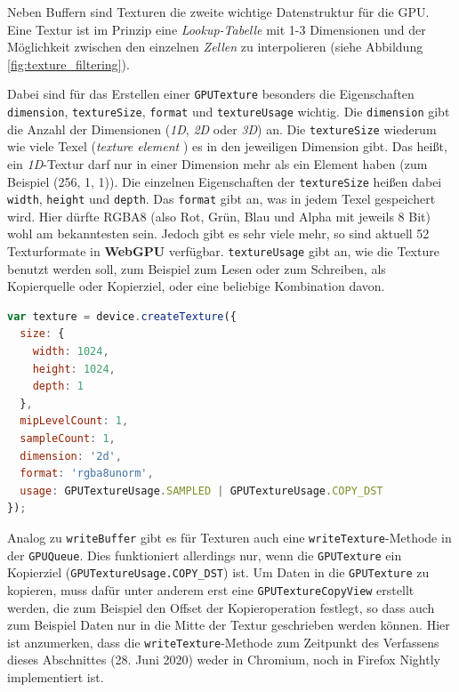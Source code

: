 \documentclass[oneside]{ausarbeitung}
\begin{document}
Neben Buffern sind Texturen die zweite wichtige Datenstruktur für die \ac{GPU}. Eine Textur ist im Prinzip eine \textit{Lookup-Tabelle} \cite{wikipedia:lookup} mit 1-3 Dimensionen und der Möglichkeit zwischen den einzelnen \textit{Zellen} zu interpolieren (siehe Abbildung \ref{fig:texture_filtering}).

Dabei sind für das Erstellen einer \texttt{GPUTexture} besonders die Eigenschaften \texttt{dimension}, \texttt{textureSize}, \texttt{format} und \texttt{textureUsage} wichtig. Die \texttt{dimension} gibt die Anzahl der Dimensionen (\textit{1D}, \textit{2D} oder \textit{3D}) an. Die \texttt{textureSize} wiederum wie viele Texel (\textit{texture element} \cite{wikipedia:texel}) es in den jeweiligen Dimension gibt. Das heißt, ein \textit{1D}-Textur darf nur in einer Dimension mehr als ein Element haben (zum Beispiel (256, 1, 1)). Die einzelnen Eigenschaften der \texttt{textureSize} heißen dabei \texttt{width}, \texttt{height} und \texttt{depth}. Das \texttt{format} gibt an, was in jedem Texel gespeichert wird. Hier dürfte RGBA8 (also Rot, Grün, Blau und Alpha mit jeweils 8 Bit) wohl am bekanntesten sein. Jedoch gibt es sehr viele mehr, so sind aktuell 52 Texturformate in \textbf{WebGPU} verfügbar. \texttt{textureUsage} gibt an, wie die Texture benutzt werden soll, zum Beispiel zum Lesen oder zum Schreiben, als Kopierquelle oder Kopierziel, oder eine beliebige Kombination davon.

\begin{minipage}{\textwidth}
\begin{lstlisting}[language=JavaScript]
var texture = device.createTexture({
  size: {
  	width: 1024,
  	height: 1024,
  	depth: 1
  },
  mipLevelCount: 1,
  sampleCount: 1,
  dimension: '2d',
  format: 'rgba8unorm',
  usage: GPUTextureUsage.SAMPLED | GPUTextureUsage.COPY_DST 
});
\end{lstlisting}
\end{minipage}

Analog zu \texttt{writeBuffer} gibt es für Texturen auch eine \texttt{writeTexture}-Methode in der \texttt{GPUQueue}. Dies funktioniert allerdings nur, wenn die \texttt{GPUTexture} ein Kopierziel (\texttt{GPUTextureUsage.COPY\_DST}) ist. Um Daten in die \texttt{GPUTexture} zu kopieren, muss dafür unter anderem erst eine \texttt{GPUTextureCopyView} erstellt werden, die zum Beispiel den Offset der Kopieroperation festlegt, so dass auch zum Beispiel Daten nur in die Mitte der Textur geschrieben werden können. Hier ist anzumerken, dass die \texttt{writeTexture}-Methode zum Zeitpunkt des Verfassens dieses Abschnittes (28. Juni 2020) weder in Chromium, noch in Firefox Nightly implementiert ist.
\end{document}
